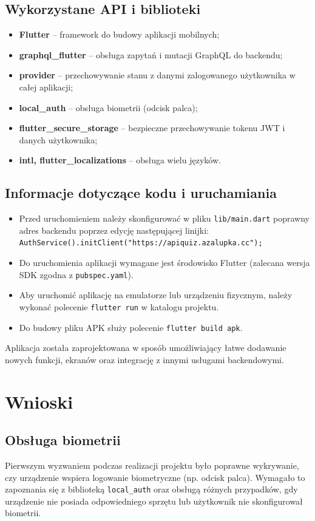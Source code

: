 \documentclass{article}
\begin{document}
	\subsection{Wykorzystane API i biblioteki}
		\begin{itemize}
			\item \textbf{Flutter} – framework do budowy aplikacji mobilnych;
			\item \textbf{graphql\_flutter} – obsługa zapytań i mutacji GraphQL do backendu;
			\item \textbf{provider} – przechowywanie stanu z danymi zalogowanego użytkownika w całej aplikacji;
			\item \textbf{local\_auth} – obsługa biometrii (odcisk palca);
			\item \textbf{flutter\_secure\_storage} – bezpieczne przechowywanie tokenu JWT i danych użytkownika;
			\item \textbf{intl, flutter\_localizations} – obsługa wielu języków.
		\end{itemize}

	\subsection{Informacje dotyczące kodu i uruchamiania}
		\begin{itemize}
			\item Przed uruchomieniem należy skonfigurować w pliku \texttt{lib/main.dart} poprawny adres backendu poprzez edycję następującej linijki: \\
			\texttt{AuthService().initClient("https://apiquiz.azalupka.cc");}
			\item Do uruchomienia aplikacji wymagane jest środowisko Flutter (zalecana wersja SDK zgodna z \texttt{pubspec.yaml}).
			\item Aby uruchomić aplikację na emulatorze lub urządzeniu fizycznym, należy wykonać polecenie \texttt{flutter run} w katalogu projektu.
			\item Do budowy pliku APK służy polecenie \texttt{flutter build apk}.
		\end{itemize}

	Aplikacja została zaprojektowana w sposób umożliwiający łatwe dodawanie nowych funkcji, ekranów oraz integrację z innymi usługami backendowymi.

\section{Wnioski}
\subsection{Obsługa biometrii}
	Pierwszym wyzwaniem podczas realizacji projektu było poprawne wykrywanie, czy urządzenie wspiera logowanie biometryczne (np. odcisk palca). Wymagało to zapoznania się z biblioteką \texttt{local\_auth} oraz obsługą różnych przypadków, gdy urządzenie nie posiada odpowiedniego sprzętu lub użytkownik nie skonfigurował biometrii.
	
\end{document}
